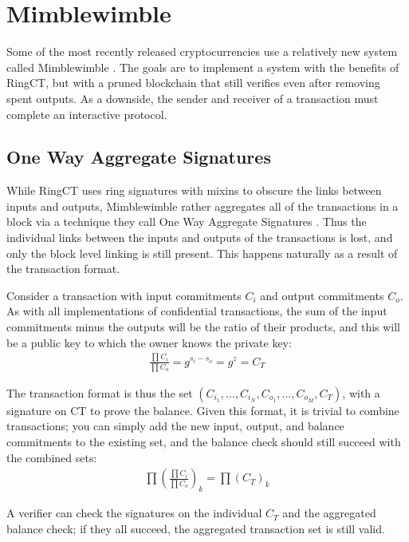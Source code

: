 \documentclass{article}
\begin{document}
\section{Mimblewimble}

Some of the most recently released cryptocurrencies use a relatively new system called Mimblewimble \cite{mimblewimble}.  The goals are to implement a system with the benefits of RingCT, but with a pruned blockchain that still verifies even after removing spent outputs.  As a downside, the sender and receiver of a transaction must complete an interactive protocol.


\subsection{One Way Aggregate Signatures}

While RingCT uses ring signatures with mixins to obscure the links between inputs and outputs, Mimblewimble rather aggregates all of the transactions in a block via a technique they call One Way Aggregate Signatures \cite{increasingBitcoinAnonymity}.  Thus the individual links between the inputs and outputs of the transactions is lost, and only the block level linking is still present.  This happens naturally as a result of the transaction format.

Consider a transaction with input commitments $C_i$ and output commitments $C_o$.  As with all implementations of confidential transactions, the sum of the input commitments minus the outputs will be the ratio of their products, and this will be a public key to which the owner knows the private key:
\begin{align}
  \frac{\prod C_i}{\prod C_o} = g^{s_i - s_o} = g^z = C_T
\end{align}

The transaction format is thus the set $(C_{i_1}, ..., C_{i_N}, C_{o_1}, ..., C_{o_M}, C_T)$, with a signature on CT to prove the balance.  Given this format, it is trivial to combine transactions; you can simply add the new input, output, and balance commitments to the existing set, and the balance check should still succeed with the combined sets:
\begin{align}
  \prod (\frac{\prod C_i}{\prod C_o})_k= \prod (C_T)_k
\end{align}

A verifier can check the signatures on the individual $C_T$ and the aggregated balance check; if they all succeed, the aggregated transaction set is still valid.
\end{document}
